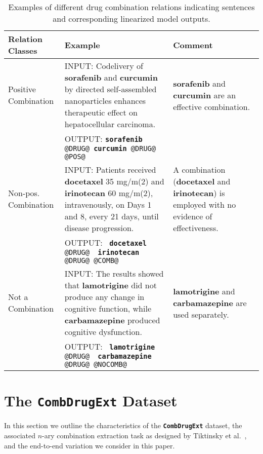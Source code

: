 \documentclass[conference]{IEEEtran}
\begin{document}
\begin{table*}[t]
\renewcommand{\arraystretch}{1.2}
\centering
\caption{Examples of different drug combination relations indicating sentences and corresponding linearized model outputs.}

\label{fig:complexities}

\begin{tabular}{p{} p{} p{}}
\toprule
Relation Classes &
  Example &
  Comment \\ \midrule
  \multirow{3.5}{*}{Positive Combination  } &
  INPUT: Codelivery of \textbf{sorafenib} and \textbf{curcumin} by directed self-assembled nanoparticles enhances therapeutic effect on hepatocellular carcinoma. &
  \multirow{3.5}{*}{\parbox{4cm}{{\textbf{sorafenib} and \textbf{curcumin}} are an effective combination.}} \\ \cmidrule(lr){2-2}
 &
  OUTPUT: \texttt{{\textbf{sorafenib} @DRUG@} {\textbf{curcumin} @DRUG@ @POS@}}  &
   \\ \cmidrule(r){1-3}
  \multirow{3.5}{*}{Non-pos. Combination} &
  INPUT: Patients received \textbf{docetaxel} 35 mg/m(2) and \textbf{irinotecan} 60 mg/m(2), intravenously, on Days 1 and 8, every 21 days, until disease progression. &
  \multirow{3.5}{*}{\parbox{4cm}{A combination (\textbf{docetaxel} and \textbf{irinotecan}) is employed with no evidence of effectiveness.}} \\ \cmidrule(lr){2-2}
 &
   OUTPUT: \texttt{{ \textbf{docetaxel}}  { @DRUG@} { \textbf{irinotecan} @DRUG@} @COMB@} &
   \\ \cmidrule(r){1-3}
   
\multirow{3.5}{*}{Not a Combination} &
  INPUT: The results showed that \textbf{lamotrigine} did not produce any change in cognitive function, while \textbf{carbamazepine} produced cognitive dysfunction. &
  \multirow{3.5}{*}{\parbox{4cm}{\textbf{lamotrigine} and \textbf{carbamazepine} are used separately.}} \\ \cmidrule(lr){2-2}
 &
   OUTPUT: \texttt{{ \textbf{lamotrigine} @DRUG@} { \textbf{carbamazepine} @DRUG@} @NOCOMB@} &
   \\ \bottomrule
\end{tabular}
\vspace{-3mm}
\end{table*}





\section{The \textbf{\texttt{CombDrugExt}}  Dataset}
\label{sec-data}
 In this section we outline the characteristics of the \textbf{\texttt{CombDrugExt}} dataset, the associated  $n$-ary combination extraction task as designed by Tiktinsky et al.~\cite{tiktinsky-etal-2022-dataset}, and the end-to-end variation we consider in this paper.
 
\end{document}
